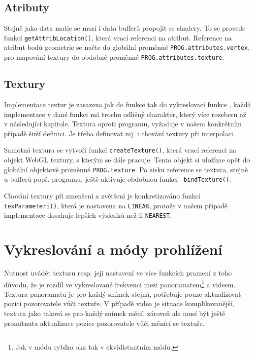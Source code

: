 \subsection{Atributy}
Stejně jako data matic se musí i data bufferů propojit se shadery. To se provede funkcí \texttt{getAttribLocation()}, která vrací referenci na atribut. Reference na atribut bodů geometrie se načte   do globální proměnné \texttt{PROG.attributes.vertex}, pro mapování textury do obdobné proměnné \texttt{PROG.attributes.texture}.


\subsection{Textury}
Implementace textur je zasazena jak do funkce \texttt{\setupProgram} tak do vykreslovací funkce \texttt{\render}, každá implementace v dané funkci má trochu odlišný charakter, který více rozeberu až v následující kapitole. Textura oproti programu, vyžaduje v našem konkrétním případě širší definici. Je třeba definovat mj. i chování textury při interpolaci.

Samotná textura se vytvoří funkcí \texttt{createTexture()}, která vrací referenci na objekt WebGL textury, s kterým se dále pracuje. Tento objekt si uložíme opět do globální objektové proměnné \texttt{PROG.texture}. Po zisku  reference se textura, stejně u bufferů popř. programu, ještě aktivuje obdobnou funkcí \texttt{ bindTexture()}.

Chování textury při zmenšení a zvětšení je konkretizováno funkcí \texttt{texParameteri()}, která je nastavena na \texttt{LINEAR}, protože v našem případě implementace dosahuje lepších výsledků než-li \texttt{NEAREST}.


\newpage

\section{Vykreslování a módy prohlížení}
Nutnost uvádět texturu resp. její nastavení ve více funkcích pramení z toho důvodu, že je rozdíl ve vykreslované frekvenci mezi panoramatem\footnote{Jak v módu rybího oka tak v ekvidistantním módu.} a videem. Textura panoramatu je pro každý snímek stejná, potřebuje pouze aktualizovat pozici pozorovatele vůči textuře. V případě videa je situace komplikovanější, textura jako taková se pro každý snímek mění, zároveň ale musí být ještě promítnuta aktualizace pozice pozorovatele vůči měnící se textuře. 

